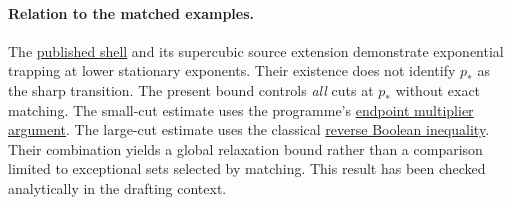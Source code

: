 \paragraph{Relation to the matched examples.}
The
\href{https://airr.science/papers/ARR-2026-2B2W1WQ7DF9N5VW7/versions/v1/}{published shell}
and its supercubic source extension demonstrate exponential trapping at
lower stationary exponents. Their existence does not identify $p_*$ as
the sharp transition. The present bound controls \emph{all} cuts at $p_*$
without exact matching. The small-cut estimate uses the programme's
\href{https://github.com/lluiseriksson/THE-ERIKSSON-PROGRAMME/blob/fba5e8b72687d68a1698b9b6acabdfea9d0aeb05/papers/stationary-weighting354/research/2026-11-18-small-support/MATCHING-ORDER-ENDPOINT.md}{endpoint multiplier argument}.
The large-cut estimate uses the classical
\href{https://arxiv.org/abs/1108.1210}{reverse Boolean inequality}.
Their combination yields a global relaxation bound rather than a
comparison limited to exceptional sets selected by matching. This result
has been checked analytically in the drafting context.
